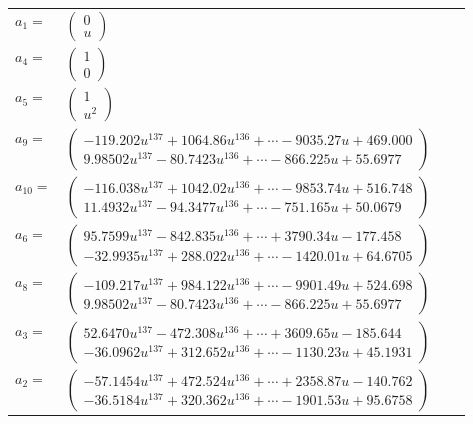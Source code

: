 \documentclass[1p]{elsarticle_modified}
\theoremstyle{definition}
\begin{document}
\begin{tabular}{m{7pt} m{180pt} m{7pt} m{180pt} }
\flushright $a_{1}=$&$\begin{pmatrix}0\\u\end{pmatrix}$ \\
\flushright $a_{4}=$&$\begin{pmatrix}1\\0\end{pmatrix}$ \\
\flushright $a_{5}=$&$\begin{pmatrix}1\\u^2\end{pmatrix}$ \\
\flushright $a_{9}=$&$\begin{pmatrix}-119.202 u^{137}+1064.86 u^{136}+\cdots-9035.27 u+469.000\\9.98502 u^{137}-80.7423 u^{136}+\cdots-866.225 u+55.6977\end{pmatrix}$ \\
\flushright $a_{10}=$&$\begin{pmatrix}-116.038 u^{137}+1042.02 u^{136}+\cdots-9853.74 u+516.748\\11.4932 u^{137}-94.3477 u^{136}+\cdots-751.165 u+50.0679\end{pmatrix}$ \\
\flushright $a_{6}=$&$\begin{pmatrix}95.7599 u^{137}-842.835 u^{136}+\cdots+3790.34 u-177.458\\-32.9935 u^{137}+288.022 u^{136}+\cdots-1420.01 u+64.6705\end{pmatrix}$ \\
\flushright $a_{8}=$&$\begin{pmatrix}-109.217 u^{137}+984.122 u^{136}+\cdots-9901.49 u+524.698\\9.98502 u^{137}-80.7423 u^{136}+\cdots-866.225 u+55.6977\end{pmatrix}$ \\
\flushright $a_{3}=$&$\begin{pmatrix}52.6470 u^{137}-472.308 u^{136}+\cdots+3609.65 u-185.644\\-36.0962 u^{137}+312.652 u^{136}+\cdots-1130.23 u+45.1931\end{pmatrix}$ \\
\flushright $a_{2}=$&$\begin{pmatrix}-57.1454 u^{137}+472.524 u^{136}+\cdots+2358.87 u-140.762\\-36.5184 u^{137}+320.362 u^{136}+\cdots-1901.53 u+95.6758\end{pmatrix}$ \\

\end{tabular}
\end{document}
